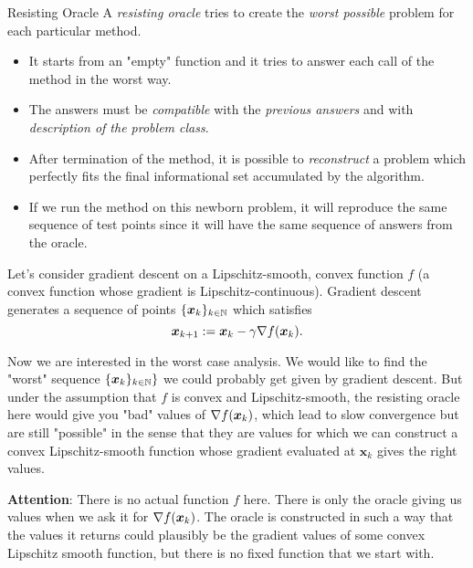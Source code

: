 \begin{colorboxnote}{Resisting Oracle}
    A \emph{resisting oracle} tries to create the \emph{worst possible} problem for each particular method.
    \begin{itemize}
        \item It starts from an "empty" function and it tries to answer each call of the method in the worst way.
        \item The answers must be \emph{compatible} with the \emph{previous answers} and with \emph{description of the problem class}.
        \item After termination of the method, it is possible to \emph{reconstruct} a problem which perfectly fits the final informational set accumulated by the algorithm.
        \item If we run the method on this newborn problem, it will reproduce the same sequence of test points since it will have the same sequence of answers from the oracle.
    \end{itemize}
\end{colorboxnote}

\begin{example}
    Let's consider gradient descent on a Lipschitz-smooth, convex function \(f\) (a convex function whose gradient is Lipschitz-continuous). Gradient descent generates a sequence 
    of points \(\{\bm{x}_k\}_{k \in \mathbb{N}}\) which satisfies
    \[
        \bm{x}_{k+1} := \bm{x}_{k} - \gamma \nabla f(\bm{x}_{k}).
    \]

    Now we are interested in the worst case analysis. We would like to find the "worst" sequence \(\{\bm{x}_k\}_{k \in \mathbb{N}}\}\) we could probably get given by gradient descent.
    But under the assumption that \(f\) is convex and Lipschitz-smooth, the resisting oracle here would give you "bad" values of \(\nabla f(\bm{x}_k)\), which lead to slow convergence but
    are still "possible" in the sense that they are values for which we can construct a convex Lipschitz-smooth function whose gradient evaluated at \(\bm{x}_k\) gives the right values.

    \textbf{Attention}: There is no actual function \(f\) here.  There is only the oracle giving us values when we ask it for \(\nabla f(\bm{x}_k)\). The oracle is constructed in such a way 
    that the values it returns could plausibly be the gradient values of some convex Lipschitz smooth function, but there is no fixed function that we start with.
\end{example}

